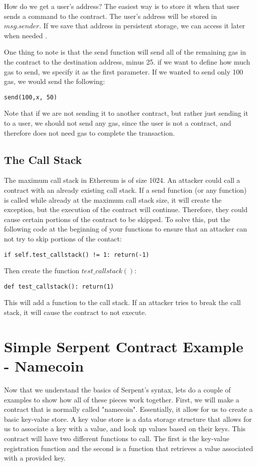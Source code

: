 \documentclass[12pt]{article}
\begin{document}
How do we get a user's address? The easiest way is to store it when that user sends a command to the contract. The user's address will be stored in $msg.sender$. If we save that address in persistent storage, we can access it later when needed \cite{Serpent}.

One thing to note is that the send function will send all of the remaining gas in the contract to the destination address, minus 25. if we want to define how much gas to send, we specify it as the first parameter. If we wanted to send only 100 gas, we would send the following: 

\begin{verbatim}
send(100,x, 50)
\end{verbatim}

Note that if we are not sending it to another contract, but rather just sending it to a user, we should not send any gas, since the user is not a contract, and therefore does not need gas to complete the transaction. 

\subsection{The Call Stack}

The maximum call stack in Ethereum is of size 1024. An attacker could call a contract with an already existing call stack. If a send function (or any function) is called while already at the maximum call stack size, it will create the exception, but the execution of the contract will continue. Therefore, they could cause certain portions of the contract to be skipped. To solve this, put the following code at the beginning of your functions to ensure that an attacker can not try to skip portions of the contact:

\begin{verbatim}
if self.test_callstack() != 1: return(-1)
\end{verbatim} 

Then create the function $test\_callstack()$:

\begin{verbatim}
def test_callstack(): return(1)
\end{verbatim}

This will add a function to the call stack. If an attacker tries to break the call stack, it will cause the contract to not execute.

\section{Simple Serpent Contract Example - Namecoin}
Now that we understand the basics of Serpent's syntax, lets do a couple of examples to show how all of these pieces work together. First, we will make a contract that is normally called "namecoin". Essentially, it allow for us to create a basic key-value store. A key value store is a data storage structure that allows for us to associate a key with a value, and look up values based on their keys. This contract will have two different functions to call. The first is the key-value registration function and the second is a function that retrieves a value associated with a provided key.
\end{document}

